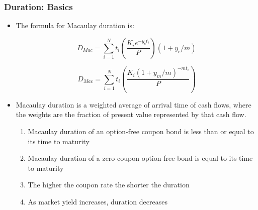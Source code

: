\documentclass[10pt]{beamer}
\begin{document}
\begin{frame}
	\frametitle{Duration: Basics}
	
	\begin{itemize} \itemsep15pt
		\item The formula for Macaulay duration is: 
		
		$$
		D_{Mac} = \sum_{i=1}^{N} t_i \left( \frac{ K_i e^{-y_c t_i}}{P}  \right) (1+y_c/ m)
		$$
		
		$$
		D_{Mac} = \sum_{i=1}^{N} t_i \left( \frac{K_i \left( 1+ y_m/m \right)^{-mt_i}}{P} \right)  
		$$
		
		\item Macaulay duration is a weighted average of arrival time of
		cash flows, where the weights are the fraction of present value represented by that cash flow.
		
		\begin{enumerate}
			\item Macaulay duration of an option-free coupon bond is less than
			or equal to its time to maturity
			\item Macaulay duration of a zero coupon option-free bond is equal
			to its time to maturity
			\item The higher the coupon rate the shorter the duration
			\item As market yield increases, duration decreases
		\end{enumerate}
	\end{itemize}
	
\end{frame}
\end{document}
